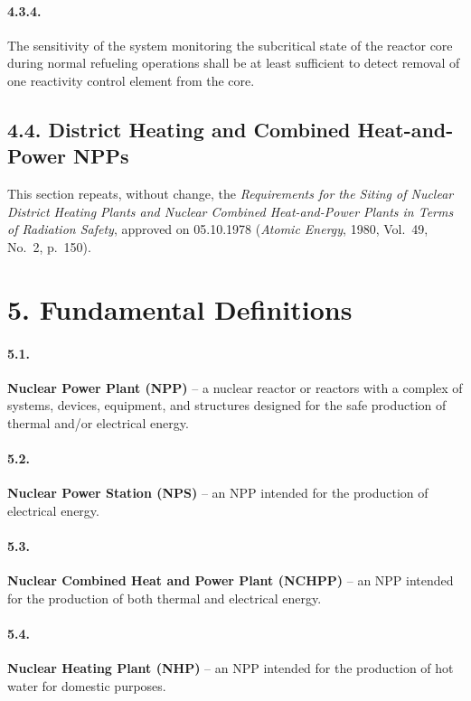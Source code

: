 \documentclass[openright]{bookest}
\begin{document}
\paragraph{4.3.4.}
The sensitivity of the system monitoring the subcritical state of the reactor core during normal refueling operations shall be at least sufficient to detect removal of one reactivity control element from the core.

\subsection*{4.4. District Heating and Combined Heat-and-Power NPPs}

This section repeats, without change, the \textit{Requirements for the Siting of Nuclear District Heating Plants and Nuclear Combined Heat-and-Power Plants in Terms of Radiation Safety}, approved on 05.10.1978 (\textit{Atomic Energy}, 1980, Vol.~49, No.~2, p.~150).

\section*{5. Fundamental Definitions}

\paragraph{5.1.}
\textbf{Nuclear Power Plant (NPP)} -- a nuclear reactor or reactors with a complex of systems, devices, equipment, and structures designed for the safe production of thermal and/or electrical energy.

\paragraph{5.2.}
\textbf{Nuclear Power Station (NPS)} -- an NPP intended for the production of electrical energy.

\paragraph{5.3.}
\textbf{Nuclear Combined Heat and Power Plant (NCHPP)} -- an NPP intended for the production of both thermal and electrical energy.

\paragraph{5.4.}
\textbf{Nuclear Heating Plant (NHP)} -- an NPP intended for the production of hot water for domestic purposes.
\end{document}
